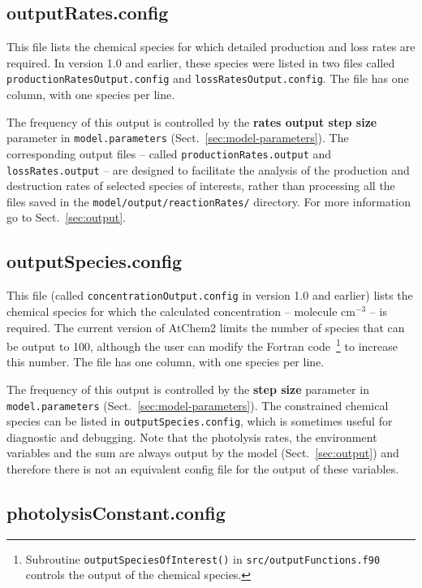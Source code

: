 \subsection{outputRates.config} \label{subsec:outputrates}

This file lists the chemical species for which detailed production and
loss rates are required. In version 1.0 and earlier, these species
were listed in two files called \texttt{productionRatesOutput.config}
and \texttt{lossRatesOutput.config}. The file has one column, with one
species per line.

The frequency of this output is controlled by the
\textbf{rates output step size} parameter in \texttt{model.parameters}
(Sect.~\ref{sec:model-parameters}). The corresponding output files --
called \texttt{productionRates.output} and \texttt{lossRates.output}
-- are designed to facilitate the analysis of the production and
destruction rates of selected species of interests, rather than
processing all the files saved in the
\texttt{model/output/reactionRates/} directory. For more information
go to Sect.~\ref{sec:output}.

\subsection{outputSpecies.config} \label{subsec:outputspecies}

This file (called \texttt{concentrationOutput.config} in version 1.0
and earlier) lists the chemical species for which the calculated
concentration -- molecule cm$^{-3}$ -- is required. The current
version of AtChem2 limits the number of species that can be output to
100, although the user can modify the Fortran
code~\footnote{Subroutine \texttt{outputSpeciesOfInterest()} in
  \texttt{src/outputFunctions.f90} controls the output of the chemical
  species.} to increase this number. The file has one column, with one
species per line.

The frequency of this output is controlled by the \textbf{step size}
parameter in \texttt{model.parameters} (Sect.~\ref{sec:model-parameters}).
The constrained chemical species can be listed in
\texttt{outputSpecies.config}, which is sometimes useful for
diagnostic and debugging. Note that the photolysis rates, the
environment variables and the  sum are always output by the
model (Sect.~\ref{sec:output}) and therefore there is not an
equivalent config file for the output of these variables.

\subsection{photolysisConstant.config} \label{subsec:photolysisconstant}

